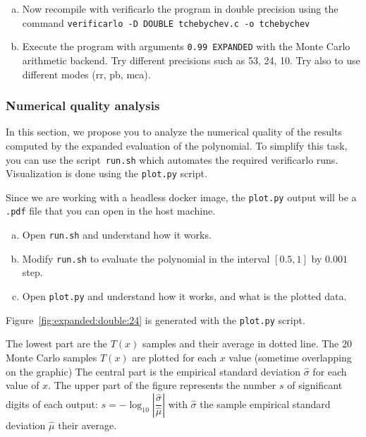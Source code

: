\begin{question}
  \begin{enumerate}[(a)]
  \item Now recompile with verificarlo the program in double precision using the command
    {\tt verificarlo -D DOUBLE tchebychev.c -o tchebychev} \\
  \item Execute the program with arguments \texttt{0.99 EXPANDED} with the Monte Carlo arithmetic backend. Try different precisions such as 53, 24, 10. Try also to use different modes (rr, pb, mca).
  \end{enumerate}
\end{question}

\subsubsection{Numerical quality analysis}

In this section, we propose you to analyze the numerical quality of the results
computed by the expanded evaluation of the polynomial. To simplify this task,
you can use the script~\texttt{run.sh} which automates the required verificarlo
runs. Visualization is done using the \texttt{plot.py} script.

Since we are working with a headless docker image, the \texttt{plot.py} output
will be a \texttt{.pdf} file that you can open in the host machine.


\begin{question}
  \begin{enumerate}[(a)]
 \item Open {\tt run.sh} and understand how it works.
  \item Modify {\tt run.sh} to evaluate the polynomial in the interval $[0.5,1]$ by $0.001$ step.
  \item Open {\tt plot.py} and understand how it works, and what is the plotted data.
  \end{enumerate}
\end{question}

Figure~\ref{fig:expanded:double:24} is generated with the \texttt{plot.py} script.

The lowest part are the $T(x)$ samples and their average in dotted line. The 20 Monte Carlo samples $T(x)$ are plotted for each $x$ value (sometime overlapping on the graphic)
The central part is the empirical standard deviation $\hat\sigma$ for each value of $x$.
The upper part of the figure represents the number $s$ of significant digits of each output: $s=-\log_{10}\left|\dfrac{\hat\sigma}{\hat\mu}\right|$ with $\hat\sigma$ the sample empirical standard deviation  $\hat\mu$ their average.

